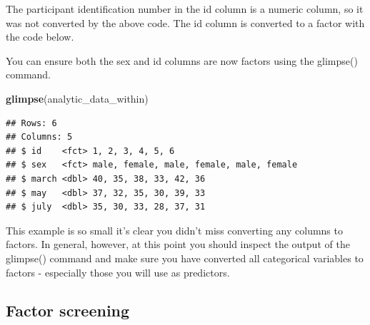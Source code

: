 \documentclass[
]{krantz}
\makeatletter
\newenvironment{Shaded}{\begin{snugshade}}{\end{snugshade}}
\newcommand{\DataTypeTok}[1]{\textcolor[rgb]{0.27,0.27,0.27}{#1}}
\newcommand{\KeywordTok}[1]{\textcolor[rgb]{0.27,0.27,0.27}{\textbf{#1}}}
\newcommand{\NormalTok}[1]{#1}
\newcommand{\OperatorTok}[1]{\textcolor[rgb]{0.43,0.43,0.43}{\textbf{#1}}}
\newcommand{\StringTok}[1]{\textcolor[rgb]{0.5,0.5,0.5}{#1}}
\newenvironment{kframe}{%
\medskip{}
\setlength{\fboxsep}{.8em}
 \def\at@end@of@kframe{}%
 \ifinner\ifhmode%
  \def\at@end@of@kframe{\end{minipage}}%
  \begin{minipage}{\columnwidth}%
 \fi\fi%
 \def\FrameCommand##1{\hskip\@totalleftmargin \hskip-\fboxsep
 \colorbox{shadecolor}{##1}\hskip-\fboxsep
     \hskip-\linewidth \hskip-\@totalleftmargin \hskip\columnwidth}%
 \MakeFramed {\advance\hsize-\width
   \@totalleftmargin\z@ \linewidth\hsize
   \@setminipage}}%
 {\par\unskip\endMakeFramed%
 \at@end@of@kframe}
\renewenvironment{Shaded}{\begin{kframe}}{\end{kframe}}
\makeatother
\begin{document}
\begin{Shaded}
\end{Shaded}

The participant identification number in the id column is a numeric column, so it was not converted by the above code. The id column is converted to a factor with the code below.

\begin{Shaded}
\end{Shaded}

You can ensure both the sex and id columns are now factors using the glimpse() command.

\begin{Shaded}
\begin{Highlighting}[]
\KeywordTok{glimpse}\NormalTok{(analytic_data_within)}
\end{Highlighting}
\end{Shaded}

\begin{verbatim}
## Rows: 6
## Columns: 5
## $ id    <fct> 1, 2, 3, 4, 5, 6
## $ sex   <fct> male, female, male, female, male, female
## $ march <dbl> 40, 35, 38, 33, 42, 36
## $ may   <dbl> 37, 32, 35, 30, 39, 33
## $ july  <dbl> 35, 30, 33, 28, 37, 31
\end{verbatim}

This example is so small it's clear you didn't miss converting any columns to factors. In general, however, at this point you should inspect the output of the glimpse() command and make sure you have converted all categorical variables to factors - especially those you will use as predictors.

\hypertarget{factor-screening-1}{%
\subsection{Factor screening}\label{factor-screening-1}}
\end{document}
